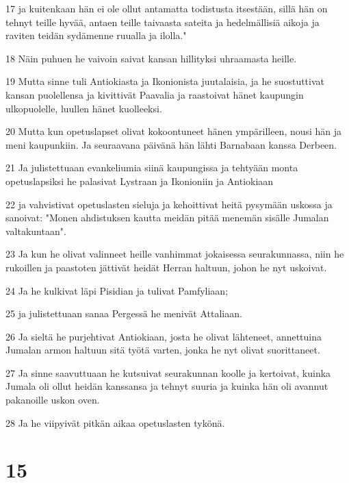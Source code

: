 \par 17 ja kuitenkaan hän ei ole ollut antamatta todistusta itsestään, sillä hän on tehnyt teille hyvää, antaen teille taivaasta sateita ja hedelmällisiä aikoja ja raviten teidän sydämenne ruualla ja ilolla."
\par 18 Näin puhuen he vaivoin saivat kansan hillityksi uhraamasta heille.
\par 19 Mutta sinne tuli Antiokiasta ja Ikonionista juutalaisia, ja he suostuttivat kansan puolellensa ja kivittivät Paavalia ja raastoivat hänet kaupungin ulkopuolelle, luullen hänet kuolleeksi.
\par 20 Mutta kun opetuslapset olivat kokoontuneet hänen ympärilleen, nousi hän ja meni kaupunkiin. Ja seuraavana päivänä hän lähti Barnabaan kanssa Derbeen.
\par 21 Ja julistettuaan evankeliumia siinä kaupungissa ja tehtyään monta opetuslapsiksi he palasivat Lystraan ja Ikonioniin ja Antiokiaan
\par 22 ja vahvistivat opetuslasten sieluja ja kehoittivat heitä pysymään uskossa ja sanoivat: "Monen ahdistuksen kautta meidän pitää menemän sisälle Jumalan valtakuntaan".
\par 23 Ja kun he olivat valinneet heille vanhimmat jokaisessa seurakunnassa, niin he rukoillen ja paastoten jättivät heidät Herran haltuun, johon he nyt uskoivat.
\par 24 Ja he kulkivat läpi Pisidian ja tulivat Pamfyliaan;
\par 25 ja julistettuaan sanaa Pergessä he menivät Attaliaan.
\par 26 Ja sieltä he purjehtivat Antiokiaan, josta he olivat lähteneet, annettuina Jumalan armon haltuun sitä työtä varten, jonka he nyt olivat suorittaneet.
\par 27 Ja sinne saavuttuaan he kutsuivat seurakunnan koolle ja kertoivat, kuinka Jumala oli ollut heidän kanssansa ja tehnyt suuria ja kuinka hän oli avannut pakanoille uskon oven.
\par 28 Ja he viipyivät pitkän aikaa opetuslasten tykönä.

\chapter{15}

